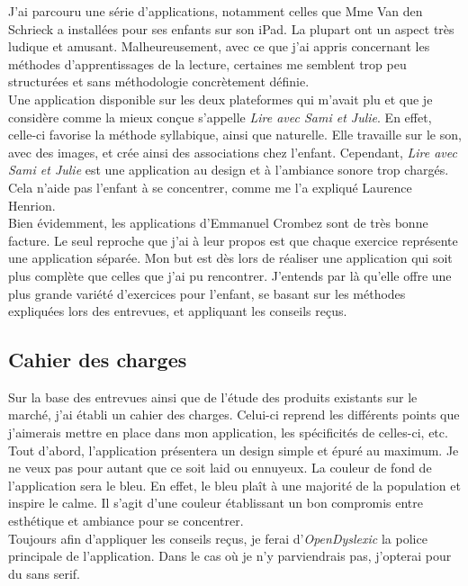 J'ai parcouru une série d'applications, notamment celles que Mme Van den Schrieck a installées pour ses enfants sur son iPad. La plupart ont un aspect très ludique et amusant. Malheureusement, avec ce que j'ai appris concernant les méthodes d'apprentissages de la lecture, certaines me semblent trop peu structurées et sans méthodologie concrètement définie.\\

Une application disponible sur les deux plateformes qui m'avait plu et que je considère comme la mieux conçue s'appelle \textit{Lire avec Sami et Julie}. En effet, celle-ci favorise la méthode syllabique, ainsi que naturelle. Elle travaille sur le son, avec des images, et crée ainsi des associations chez l'enfant. Cependant, \textit{Lire avec Sami et Julie} est une application au design et à l'ambiance sonore trop chargés. Cela n'aide pas l'enfant à se concentrer, comme me l'a expliqué Laurence Henrion.\\

Bien évidemment, les applications d'Emmanuel Crombez sont de très bonne facture. Le seul reproche que j'ai à leur propos est que chaque exercice représente une application séparée. Mon but est dès lors de réaliser une application qui soit plus complète que celles que j'ai pu rencontrer. J'entends par là qu'elle offre une plus grande variété d'exercices pour l'enfant, se basant sur les méthodes expliquées lors des entrevues, et appliquant les conseils reçus.

\subsection{Cahier des charges}
Sur la base des entrevues ainsi que de l'étude des produits existants sur le marché, j'ai établi un cahier des charges. Celui-ci reprend les différents points que j'aimerais mettre en place dans mon application, les spécificités de celles-ci, etc.\\

Tout d'abord, l'application présentera un design simple et épuré au maximum. Je ne veux pas pour autant que ce soit laid ou ennuyeux. La couleur de fond de l'application sera le bleu. En effet, le bleu plaît à une majorité de la population et inspire le calme. Il s'agit d'une couleur établissant un bon compromis entre esthétique et ambiance pour se concentrer.\\

Toujours afin d'appliquer les conseils reçus, je ferai d'\textit{OpenDyslexic} la police principale de l'application. Dans le cas où je n'y parviendrais pas, j'opterai pour du sans serif.\\

